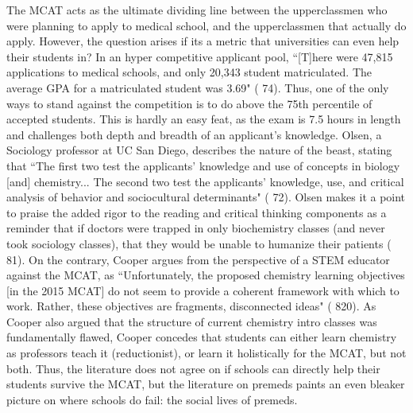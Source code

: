 \documentclass [12pt]{article}
\begin{document}
\begin{flushleft}
The MCAT acts as the ultimate dividing line between the upperclassmen who were planning to apply to medical school, and the upperclassmen that actually do apply. However, the question arises if its a metric that universities can  even help their students in? In an hyper competitive applicant pool, {``}[T]here were 47,815 applications to medical schools, and only 20,343 student matriculated. The average GPA for a matriculated student was 3.69" (\cite{Olsen-2016} 74). Thus, one of the only ways to stand against the competition is to do above the 75th percentile of accepted students. This is hardly an easy feat, as the exam is 7.5 hours in length and challenges both depth and breadth of an applicant's knowledge. Olsen, a Sociology professor at UC San Diego, describes the nature of the beast, stating that {``}The first two test the applicants' knowledge and use of concepts in biology [and] chemistry... The second two test the applicants' knowledge, use, and critical analysis of behavior and sociocultural determinants" (\cite{Olsen-2016} 72). Olsen makes it a point to praise the added rigor to the reading and critical thinking components as a reminder that if doctors were trapped in only biochemistry classes (and never took sociology classes), that they would be unable to humanize their patients (\cite{Olsen-2016} 81). On the contrary, Cooper argues from the perspective of a STEM educator against the MCAT, as {``}Unfortunately, the proposed chemistry learning objectives [in the 2015 MCAT] do not seem to provide a coherent framework with which to work. Rather, these objectives are fragments, disconnected ideas" (\cite{Cooper-2013} 820). As Cooper also argued that the structure of current chemistry intro classes was fundamentally flawed, Cooper concedes that students can either learn chemistry as professors teach it (reductionist), or learn it holistically for the MCAT, but not both. Thus, the literature does not agree on if schools can directly help their students survive the MCAT, but the literature on premeds paints an even bleaker picture on where schools do fail: the social lives of premeds.
	  

\end{flushleft}
\end{document}
